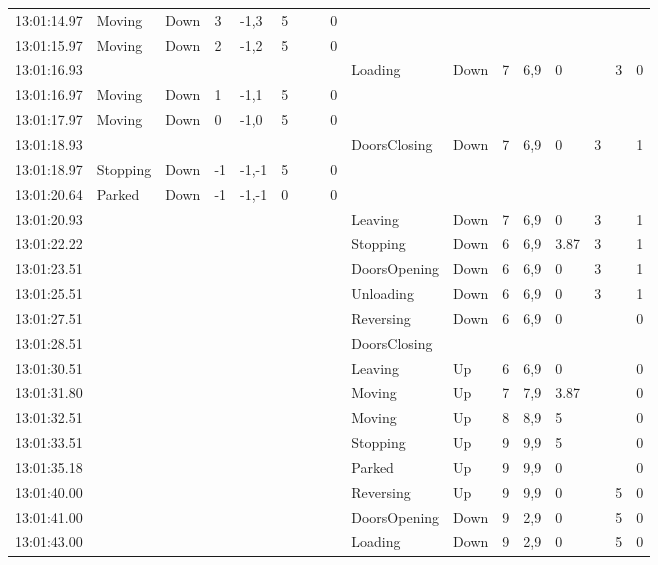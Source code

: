 \documentclass{UoYCSproject}
\begin{document}
\begin{appendices}
\begin{landscape}
\begin{longtable}{l || l | l | l | l | l | l | l | l || l | l | l | l | l | l | l | l}
	13:01:14.97 & Moving & Down & 3 & -1,3 & 5 &  &  & 0 &  &  &  &  &  &  &  &  \\
	13:01:15.97 & Moving & Down & 2 & -1,2 & 5 &  &  & 0 &  &  &  &  &  &  &  &  \\
	13:01:16.93 &  &  &  &  &  &  &  &  & Loading & Down & 7 & 6,9 & 0 &  & 3 & 0 \\
	13:01:16.97 & Moving & Down & 1 & -1,1 & 5 &  &  & 0 &  &  &  &  &  &  &  &  \\
	13:01:17.97 & Moving & Down & 0 & -1,0 & 5 &  &  & 0 &  &  &  &  &  &  &  &  \\
	13:01:18.93 &  &  &  &  &  &  &  &  & DoorsClosing & Down & 7 & 6,9 & 0 & 3 &  & 1 \\
	13:01:18.97 & Stopping & Down & -1 & -1,-1 & 5 &  &  & 0 &  &  &  &  &  &  &  &  \\
	13:01:20.64 & Parked & Down & -1 & -1,-1 & 0 &  &  & 0 &  &  &  &  &  &  &  &  \\
	13:01:20.93 &  &  &  &  &  &  &  &  & Leaving & Down & 7 & 6,9 & 0 & 3 &  & 1 \\
	13:01:22.22 &  &  &  &  &  &  &  &  & Stopping & Down & 6 & 6,9 & 3.87 & 3 &  & 1 \\
	13:01:23.51 &  &  &  &  &  &  &  &  & DoorsOpening & Down & 6 & 6,9 & 0 & 3 &  & 1 \\
	13:01:25.51 &  &  &  &  &  &  &  &  & Unloading & Down & 6 & 6,9 & 0 & 3 &  & 1 \\
	13:01:27.51 &  &  &  &  &  &  &  &  & Reversing & Down & 6 & 6,9 & 0 &  &  & 0 \\
	13:01:28.51 &  &  &  &  &  &  &  &  & DoorsClosing &  &  &  &  &  &  &  \\
	13:01:30.51 &  &  &  &  &  &  &  &  & Leaving & Up & 6 & 6,9 & 0 &  &  & 0 \\
	13:01:31.80 &  &  &  &  &  &  &  &  & Moving & Up & 7 & 7,9 & 3.87 &  &  & 0 \\
	13:01:32.51 &  &  &  &  &  &  &  &  & Moving & Up & 8 & 8,9 & 5 &  &  & 0 \\
	13:01:33.51 &  &  &  &  &  &  &  &  & Stopping & Up & 9 & 9,9 & 5 &  &  & 0 \\
	13:01:35.18 &  &  &  &  &  &  &  &  & Parked & Up & 9 & 9,9 & 0 &  &  & 0 \\
	13:01:40.00 &  &  &  &  &  &  &  &  & Reversing & Up & 9 & 9,9 & 0 &  & 5 & 0 \\
	13:01:41.00 &  &  &  &  &  &  &  &  & DoorsOpening & Down & 9 & 2,9 & 0 &  & 5 & 0 \\
	13:01:43.00 &  &  &  &  &  &  &  &  & Loading & Down & 9 & 2,9 & 0 &  & 5 & 0 \\

\end{longtable}
\end{landscape}
\end{appendices}
\end{document}
